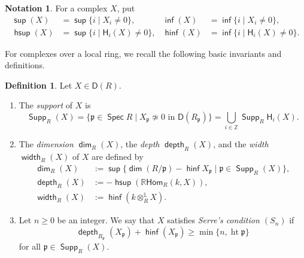 \documentclass[10pt, a4paper,reqno]{amsart}
\theoremstyle{definition}
\newtheorem{dfn}[dfn]{Definition}
\newtheorem{nota}[nota]{Notation}
\theoremstyle{remark}
\numberwithin{equation}{thm}
\def\ZZ{\mathbb{Z}}
\def\fp{\mathfrak{p}}
\def\sH{\mathsf{H}}
\def\dim{\operatorname{\mathsf{dim}}}
\def\depth{\operatorname{\mathsf{depth}}}
\def\width{\operatorname{\mathsf{width}}}
\def\Spec{\operatorname{\mathsf{Spec}}}
\def\Supp{\operatorname{\mathsf{Supp}}}
\def\D{\mathsf{D}}
\def\ltensor{\otimes^{\mathbb{L}}}
\def\rHom{\mathbb{R}\mathsf{Hom}}
\def\sup{\operatorname{\mathsf{sup}}}
\def\hsup{\operatorname{\mathsf{hsup}}}
\def\inf{\operatorname{\mathsf{inf}}}
\def\hinf{\operatorname{\mathsf{hinf}}}
\def\amp{\operatorname{\mathsf{amp}}}
\def\hamp{\operatorname{\mathsf{hamp}}}
\begin{document}
\begin{nota}\label{nota:invariants}
For a complex $X$, put
\[
\begin{aligned}
 \sup(X) &= \sup\{i\mid X_i\neq0\},&
 \inf(X) &= \inf\{i\mid X_i\neq0\},\\%
 \hsup(X) &=\sup\{i\mid\sH_i(X)\neq0\},&
 \hinf(X) &=\inf\{i\mid\sH_i(X)\neq0\}.%
\end{aligned}
\]
\end{nota}

For complexes over a local ring, we recall the following basic invariants and definitions.

\begin{dfn}\label{def:complex-invariants}
Let $X\in\D(R)$.
\begin{enumerate}[\rm(1)]
\item The {\em support} of $X$ is
\[
\Supp_R(X)=\{\fp\in\Spec R\mid X_\fp\not\simeq0\text{ in }\D(R_\fp)\}=\bigcup_{i\in\ZZ}\Supp_R\sH_i(X).
\]
\item The {\em dimension} $\dim_R(X)$, the {\em depth} $\depth_R(X)$, and the {\em width} $\width_R(X)$ of $X$ are defined by
\begin{align*}
\dim_R(X) &:=\sup\{\dim(R/\fp)-\hinf X_\fp\mid \fp\in\Supp_R(X)\}, \\
\depth_R(X) &:= -\hsup(\rHom_R(k,X)),	 \\
\width_R(X) &:= \hinf(k\ltensor_RX).
\end{align*}

\item
Let $n\geq0$ be an integer.
We say that $X$ satisfies {\em Serre's condition $(S_n)$} if
\[
\depth_{R_\fp}(X_\fp)+\hinf (X_\fp) \ge \min\{n,\operatorname{ht}\fp\}
\]
for all $\fp \in \Supp_R(X)$.
\end{enumerate}
\end{dfn}
\end{document}

